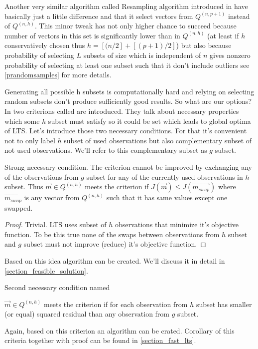 Another very similar algorithm called Resampling algorithm introduced in \cite{rousseeuw1987robust}
have basically just a little difference and that it select vectors from $Q^{(n,p+1)}$ instead of 
$Q^{(n, h)}$. This minor tweak has not only higher chance to succeed because number of vectors in this set is significantly lower than in $Q^{(n, h)}$ (at least if $h$ conservatively chosen thus $h = [(n/2] + [(p+1)/2]$) but also because probability of selecting $L$ subsets of size which is independent of $n$ gives nonzero probability of selecting at least one subset such that it don't include outliers see \ref{prandomsamples} for more details.

Generating all possible h subsets is computationally hard and relying on selecting random subsets don't produce sufficiently good results. So what are our options? In \cite{hawkins1999improved} two criterions called  are introduced. They talk about necessary properties which some $h$ subset must satisfy so it could be set which leads to global optima of LTS. Let's introduce those two necessary conditions. For that it's convenient not to only label $h$ subset of used observations but also complementary subset of not used observations. We'll refer to this complementary subset as $g$ subset.

\begin{theorem} Strong necessary condition.
The criterion cannot be improved by exchanging any of the observations from $g$ subset 
for any of the currently used observations in $h$ subset. Thus $\vec{m} \in Q^{(n, h)}$ meets the criterion if  $J(\vec{m}) \leq J(\vec{m_{swap}})$ where $\vec{m_{swap}}$ is any vector from $Q^{(n, h)}$ such that it has same values except one swapped.
\end{theorem}

\begin{proof}
	Trivial. LTS uses subset of $h$ observations that minimize it's objective function. To be this true none of the swaps between observations from $h$ subset and $g$ subset  must not improve (reduce) it's objective function. 
\end{proof}
Based on this idea algorithm can be created. We'll discuss it in detail in \ref{section_feasible_solution}.

Second necessary condition named  
\begin{theorem}
	$\vec{m} \in Q^{(n, h)}$ meets the criterion if for each observation from $h$ subset has smaller (or equal) squared residual than any observation from $g$ subset.
\end{theorem}	
Again, based on this criterion an algorithm can be crated. Corollary of this criteria together with proof can be found in \ref{section_fast_lts}. 

